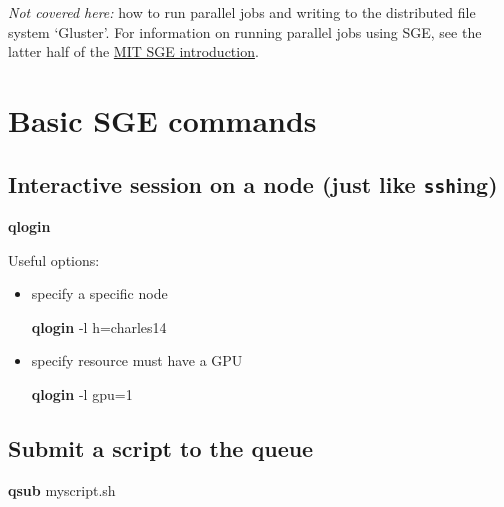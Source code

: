 \documentclass[]{article}
\newenvironment{Shaded}{\begin{snugshade}}{\end{snugshade}}
\newcommand{\KeywordTok}[1]{\textcolor[rgb]{0.13,0.29,0.53}{\textbf{{#1}}}}
\newcommand{\NormalTok}[1]{{#1}}
\begin{document}
\emph{Not covered here:} how to run parallel jobs and writing to the
distributed file system `Gluster'. For information on running parallel
jobs using SGE, see the latter half of the
\href{http://star.mit.edu/cluster/docs/0.92rc2/guides/sge.html}{MIT SGE
introduction}.

\section{Basic SGE commands}\label{basic-sge-commands}

\subsection{Interactive session on a node (just like
\texttt{ssh}ing)}\label{interactive-session-on-a-node-just-like-sshing}

\begin{Shaded}
\begin{Highlighting}[]
\KeywordTok{qlogin}
\end{Highlighting}
\end{Shaded}

Useful options:

\begin{itemize}
\item
  specify a specific node

\begin{Shaded}
\begin{Highlighting}[]
\KeywordTok{qlogin} \NormalTok{-l h=charles14}
\end{Highlighting}
\end{Shaded}
\item
  specify resource must have a GPU

\begin{Shaded}
\begin{Highlighting}[]
\KeywordTok{qlogin} \NormalTok{-l gpu=1}
\end{Highlighting}
\end{Shaded}
\end{itemize}

\subsection{Submit a script to the
queue}\label{submit-a-script-to-the-queue}

\begin{Shaded}
\begin{Highlighting}[]
\KeywordTok{qsub} \NormalTok{myscript.sh}
\end{Highlighting}
\end{Shaded}
\end{document}
